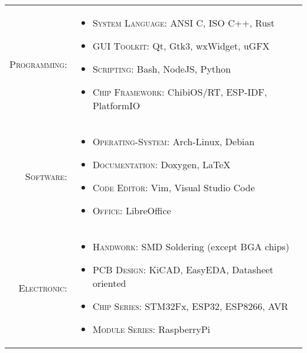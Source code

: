 %
%

\renewcommand{\arraystretch}{1.1}

\begin{tabular}{>{}r>{}p{13cm}}
    \textsc{Programming:} &
        \begin{itemize}
            \item \textsc{System Language:} ANSI C, ISO C++, Rust
            \item \textsc{GUI Toolkit:} Qt, Gtk3, wxWidget, uGFX
            \item \textsc{Scripting:} Bash, NodeJS, Python
            \item \textsc{Chip Framework:} ChibiOS/RT, ESP-IDF, PlatformIO
        \end{itemize} \\

    \textsc{Software:} &
        \begin{itemize}
            \item \textsc{Operating-System:} Arch-Linux, Debian
            \item \textsc{Documentation:} Doxygen, LaTeX
            \item \textsc{Code Editor:} Vim, Visual Studio Code
            \item \textsc{Office:} LibreOffice
        \end{itemize} \\

    \textsc{Electronic:} &
        \begin{itemize}
            \item \textsc{Handwork:} SMD Soldering (except BGA chips)
            \item \textsc{PCB Design:} KiCAD, EasyEDA, Datasheet oriented
            \item \textsc{Chip Series:} STM32Fx, ESP32, ESP8266, AVR
            \item \textsc{Module Series:} RaspberryPi
        \end{itemize} \\
\end{tabular}

